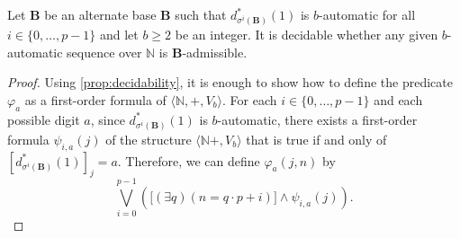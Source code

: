\documentclass[12pt,reqno]{amsart}
\newcommand{\B}{{\mathbf{B}}}
\begin{document}
\begin{corollary} 
\label{cor:alternate-automatic-decidability}
Let $\B$ be an alternate base $\B$ such that $d_{\sigma^i(\B)}^*(1)$ is $b$-automatic for all $i\in\{0,\ldots,p-1\}$ and let $b\ge 2$ be an integer. It is decidable whether any given $b$-automatic sequence over $\mathbb{N}$ is $\B$-admissible.
\end{corollary}

\begin{proof}
    Using \cref{prop:decidability}, it is enough to show how to define the predicate $\varphi_{a}$ as a first-order formula of $\langle\mathbb{N},+,V_b\rangle$. For each $i\in\{0,\ldots,p-1\}$ and each possible digit $a$, since $d_{\sigma^i(\B)}^*(1)$ is $b$-automatic, there exists a first-order formula $\psi_{i,a}(j)$ of the structure $\langle\mathbb{N}+,V_b\rangle$ that is true if and only of $[d_{\sigma^i(\B)}^*(1)]_j=a$. Therefore, we can define $\varphi_a(j,n)$ by
\[
    \bigvee_{i=0}^{p-1} \left( \big[(\exists q)(n=q\cdot p+i)\big]  \wedge \psi_{i,a}(j) \right).
\]
\end{proof}

\end{document}
